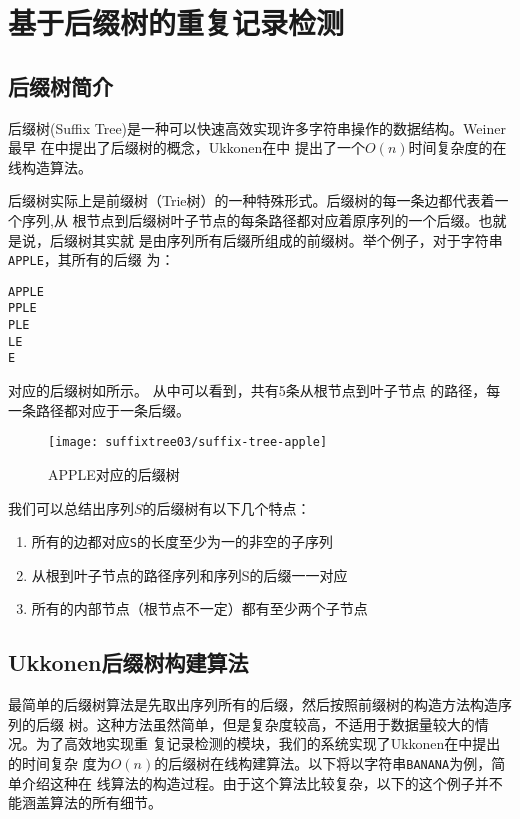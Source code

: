 
\chapter{基于后缀树的重复记录检测}
\label{chap:suffixtree}

\section{后缀树简介}
\label{sec:suffixtreeintro}
后缀树(Suffix Tree)是一种可以快速高效实现许多字符串操作的数据结构。Weiner最早
在\cite{weiner1973linear}中提出了后缀树的概念，Ukkonen在\cite{ukkonen1995line}中
提出了一个$O(n)$时间复杂度的在线构造算法。

后缀树实际上是前缀树（Trie树）的一种特殊形式。后缀树的每一条边都代表着一个序列,从
根节点到后缀树叶子节点的每条路径都对应着原序列的一个后缀。也就是说，后缀树其实就
是由序列所有后缀所组成的前缀树。举个例子，对于字符串\texttt{APPLE}，其所有的后缀
为：
\begin{verbatim}
APPLE
PPLE
PLE
LE
E
\end{verbatim}
对应的后缀树如所示。
从中可以看到，共有5条从根节点到叶子节点
的路径，每一条路径都对应于一条后缀。
\begin{figure}
  \centering
  \texttt{[image: suffixtree03/suffix-tree-apple]}
  \caption{APPLE对应的后缀树}
  \label{suffixtree:fig:suffix-tree-apple}
\end{figure}

我们可以总结出序列$S$的后缀树有以下几个特点：
\begin{enumerate}
\item 所有的边都对应\texttt{S}的长度至少为一的非空的子序列
\item 从根到叶子节点的路径序列和序列S的后缀一一对应
\item 所有的内部节点（根节点不一定）都有至少两个子节点
\end{enumerate}

\section{Ukkonen后缀树构建算法}
\label{sec:ukkonen}
最简单的后缀树算法是先取出序列所有的后缀，然后按照前缀树的构造方法构造序列的后缀
树。这种方法虽然简单，但是复杂度较高，不适用于数据量较大的情况。为了高效地实现重
复记录检测的模块，我们的系统实现了Ukkonen在\cite{ukkonen1995line}中提出的时间复杂
度为$O(n)$的后缀树在线构建算法。以下将以字符串\texttt{BANANA}为例，简单介绍这种在
线算法的构造过程。由于这个算法比较复杂，以下的这个例子并不能涵盖算法的所有细节。

